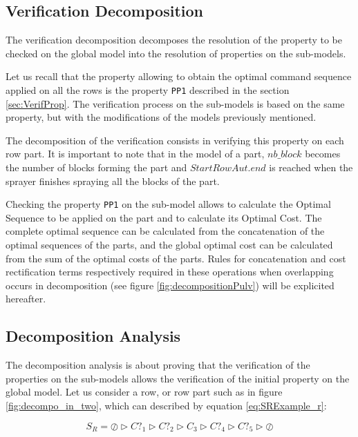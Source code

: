 \subsection{Verification Decomposition}
\label{VD}
The verification decomposition decomposes the resolution of the property to be checked on the global model into the resolution of properties on the sub-models.

Let us recall that the property allowing to obtain the optimal command sequence applied on all the rows is the property \texttt{PP1} 
described in the section \ref{sec:VerifProp}. The verification process on the sub-models is based on the same property, but with the modifications of the models previously mentioned.

The decomposition of the verification consists in verifying this property on each row part. It is important to note that in the model of a part, $ nb\_block $ becomes the number of blocks forming the part and $ StartRowAut.end $ is reached when the sprayer finishes spraying all the blocks of the part. 

Checking the property \texttt{PP1} on the sub-model allows to calculate the Optimal Sequence to be applied on the part and to calculate its Optimal Cost. 
The complete optimal sequence can be calculated from the concatenation of the optimal sequences of the parts, and the global optimal cost can be calculated from the sum of the optimal costs of the parts. Rules for concatenation and cost rectification terms respectively required in these operations when overlapping occurs in decomposition (see figure \ref{fig:decompositionPulv}) will be explicited hereafter.

\subsection{Decomposition Analysis}
\label{PreveComp}

The decomposition analysis is about proving that the verification of the properties on the sub-models allows the verification of the initial property on the global model.
Let us consider a row, or row part such as in figure \ref{fig:decompo_in_two}, which can described by equation \ref{eq:SRExample_r}:

\begin{equation}
	S_R = \oslash \triangleright C?_{1} \triangleright C?_{2} \triangleright C_{3} \triangleright C?_{4} \triangleright C?_{5} \triangleright \oslash \label{eq:SRExample_r}
\end{equation}


